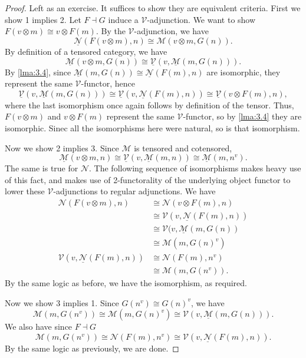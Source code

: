 \begin{proof}
	Left as an exercise. It suffices to show they are equivalent criteria. First we show 1 implies 2. Let $F\dashv G$ induce a $\mathcal{V} $-adjunction. We want to show $F(v\otimes m)\cong v\otimes F(m)$. By the $\mathcal{V} $-adjunction, we have
	\[
		\underline{\mathcal{N} } (F(v\otimes m),n)\cong \mathcal{M} (v\otimes m,G(n))
	.\]
	By definition of a tensored category, we have
	\[
		\underline{\mathcal{M} } (v\otimes m,G(n))\cong \underline{\mathcal{V} } (v,\underline{\mathcal{M} } (m,G(n)))
	.\]
	By \cref{lma:3.4}, since $\underline{\mathcal{M} } (m,G(n))\cong \underline{\mathcal{N} } (F(m),n)$ are isomorphic, they represent the same $\mathcal{V} $-functor, hence
	\[
		\underline{\mathcal{V} } (v,\underline{\mathcal{M} } (m,G(n)))\cong \underline{\mathcal{V} } (v,\underline{\mathcal{N} } (F(m),n))\cong \underline{\mathcal{V} } (v\otimes F(m),n),
	\]
	where the last isomorphism once again follows by definition of the tensor. Thus, $F(v\otimes m)$ and $v\otimes F(m)$ represent the same $\mathcal{V} $-functor, so by \cref{lma:3.4} they are isomorphic. Sinec all the isomorphisms here were natural, so is that isomorphism.

	Now we show 2 implies 3. Since $\mathcal{M} $ is tensored and cotensored,
	\[
		\underline{\mathcal{M} } (v\otimes m,n)\cong \underline{\mathcal{V} } (v,\underline{\mathcal{M} } (m,n))\cong \underline{\mathcal{M} } (m,n^v)
	.\]
	The same is true for $\mathcal{N} $. The following sequence of isomorphisms makes heavy use of this fact, and makes use of 2-functorality of the underlying object functor to lower these $\mathcal{V} $-adjunctions to regular adjunctions. We have
	\begin{align*}
		\mathcal{N} (F(v\otimes m),n)&\cong \mathcal{N} (v\otimes F(m),n)\\
					     &\cong \mathcal{V} (v,\underline{\mathcal{N} } (F(m),n))\\
					     &\cong \mathcal{V} (v,\underline{\mathcal{M} } (m,G(n))\\
					     &\cong \mathcal{M} (m,G(n)^v)\\
		\mathcal{V} (v,\underline{\mathcal{N} } (F(m),n))&\cong \mathcal{N} (F(m),n^v)\\
								 &\cong \mathcal{M} (m,G(n^v))
	.\end{align*}
	By the same logic as before, we have the isomorphism, as required.

	Now we show 3 implies 1. Since $G(n^v)\cong G(n)^v$, we have
	\[
		\mathcal{M} (m,G(n^v))\cong \mathcal{M} (m,G(n)^v)\cong \mathcal{V} (v,\underline{\mathcal{M} } (m,G(n)))
	.\]
	We also have since $F\dashv G$
	\[
		\mathcal{M} (m,G(n^v))\cong \mathcal{N} (F(m),n^v)\cong \mathcal{V} (v,\underline{\mathcal{N} } (F(m),n))
	.\]
	By the same logic as previously, we are done.
\end{proof}

